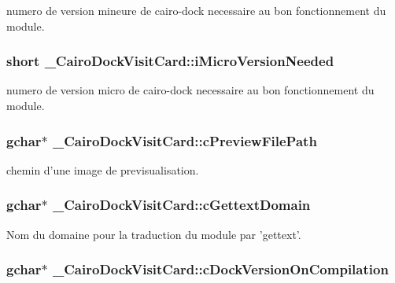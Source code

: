 numero de version mineure de cairo-dock necessaire au bon fonctionnement du module. 

\subsubsection{\setlength{\rightskip}{0pt plus 5cm}short {\bf \_\-CairoDockVisitCard::iMicroVersionNeeded}}\label{struct__CairoDockVisitCard_e5627bdce7225e6b50cd17d51bf1d8cc}


numero de version micro de cairo-dock necessaire au bon fonctionnement du module. 

\subsubsection{\setlength{\rightskip}{0pt plus 5cm}gchar$\ast$ {\bf \_\-CairoDockVisitCard::cPreviewFilePath}}\label{struct__CairoDockVisitCard_dd9afe6d2efddc609fb683b26f7b2c70}


chemin d'une image de previsualisation. 

\subsubsection{\setlength{\rightskip}{0pt plus 5cm}gchar$\ast$ {\bf \_\-CairoDockVisitCard::cGettextDomain}}\label{struct__CairoDockVisitCard_165ad4ec549047ad96971c7a4fc19df1}


Nom du domaine pour la traduction du module par 'gettext'. 

\subsubsection{\setlength{\rightskip}{0pt plus 5cm}gchar$\ast$ {\bf \_\-CairoDockVisitCard::cDockVersionOnCompilation}}\label{struct__CairoDockVisitCard_ce93fe5d878be17e87c9dbc2fad46ff1}


